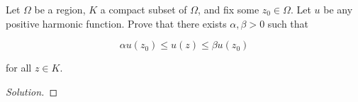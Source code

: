 \documentclass[10pt]{article}
\newenvironment{problem}[2][]{\begin{trivlist}
\item[\hskip \labelsep {\bfseries #1}\hskip \labelsep {\bfseries #2.}]}{\end{trivlist}}
\begin{document}
\begin{problem}{Question 5}
Let $\Omega$ be a region, $K$ a compact subset of $\Omega$, and fix some $z_0 \in \Omega$. Let $u$ be any positive harmonic function. Prove that there exists $\alpha, \beta > 0$ such that

$$ \alpha u(z_0) \leq u(z) \leq \beta u(z_0) $$

for all $z \in K$.

\end{problem}

\begin{proof}[Solution]

\end{proof}
\end{document}
